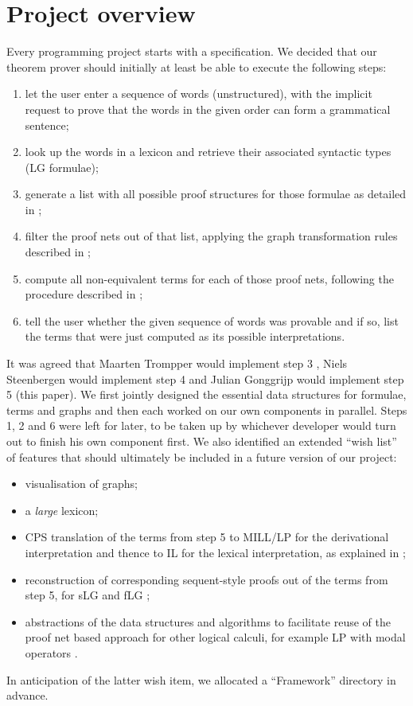 \documentclass[12pt,a4paper]{article}
\begin{document}
\section{Project overview}\label{sec:project}

Every programming project starts with a specification. We decided that our theorem prover should initially at least be able to execute the following steps:
\begin{enumerate}
    \item let the user enter a sequence of words (unstructured), with the implicit request to prove that the words in the given order can form a grammatical sentence;
    \item look up the words in a lexicon and retrieve their associated syntactic types (LG formulae);
    \item generate a list with all possible proof structures for those formulae as detailed in \cite[p.~4--7]{mm12};
    \item filter the proof nets out of that list, applying the graph transformation rules described in \cite[p.~7--11]{mm12};
    \item compute all non-equivalent terms for each of those proof nets, following the procedure described in \cite[p.~21--26]{mm12};
    \item tell the user whether the given sequence of words was provable and if so, list the terms that were just computed as its possible interpretations.
\end{enumerate}
It was agreed that Maarten Trompper would implement step 3 \cite{maarten}, Niels Steenbergen would implement step 4 \cite{niels} and Julian Gonggrijp would implement step 5 (this paper). We first jointly designed the essential data structures for formulae, terms and graphs and then each worked on our own components in parallel. Steps 1, 2 and 6 were left for later, to be taken up by whichever developer would turn out to finish his own component first. We also identified an extended ``wish list'' of features that should ultimately be included in a future version of our project:
\begin{itemize}
    \item visualisation of graphs;
    \item a \emph{large} lexicon;
    \item CPS translation of the terms from step 5 to MILL/LP for the derivational interpretation and thence to IL for the lexical interpretation, as explained in \cite[p.~14,19--21]{mm12};
    \item reconstruction of corresponding sequent-style proofs out of the terms from step 5, for sLG \cite[p.~3--4]{mm12} and fLG \cite[p.~15--18]{mm12};
    \item abstractions of the data structures and algorithms to facilitate reuse of the proof net based approach for other logical calculi, for example LP with modal operators \cite{qm02}.
\end{itemize}
In anticipation of the latter wish item, we allocated a ``Framework'' directory in advance.
\end{document}
